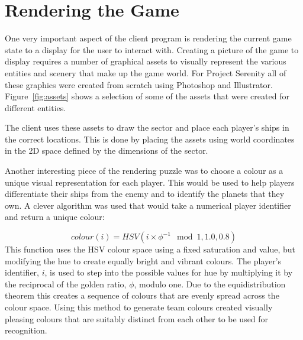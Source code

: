 \section{Rendering the Game}



One very important aspect of the client program is rendering the current game state to a display for the user to interact with. Creating a picture of the game to display requires a number of graphical assets to visually represent the various entities and scenery that make up the game world. For Project Serenity all of these graphics were created from scratch using Photoshop and Illustrator. Figure~\ref{fig:assets} shows a selection of some of the assets that were created for different entities.


%

The client uses these assets to draw the sector and place each player's ships in the correct locations. This is done by placing the assets using world coordinates in the 2D space defined by the dimensions of the sector.


Another interesting piece of the rendering puzzle was to choose a colour as a unique visual representation for each player. This would be used to help players differentiate their ships from the enemy and to identify the planets that they own. A clever algorithm was used that would take a numerical player identifier and return a unique colour:\cite{ankerl2009}

\begin{equation*}
	colour(i) = HSV(i \times \phi^{-1} \mod 1, 1.0, 0.8)
\end{equation*}
\noindent
This function uses the HSV colour space using a fixed saturation and value, but modifying the hue to create equally bright and vibrant colours. The player's identifier, $i$, is used to step into the possible values for hue by multiplying it by the reciprocal of the golden ratio, $\phi$, modulo one. Due to the equidistribution theorem this creates a sequence of colours that are evenly spread across the colour space. Using this method to generate team colours created visually pleasing colours that are suitably distinct from each other to be used for recognition.
